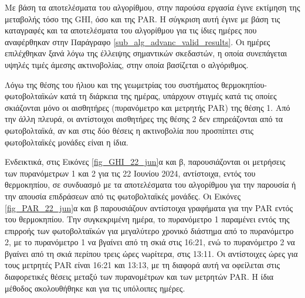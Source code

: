\documentclass[12pt, a4paper]{report} %
\newcommand{\english}{\foreignlanguage{english}}
\begin{document}
Με βάση τα αποτελέσματα του αλγορίθμου, στην παρούσα εργασία έγινε εκτίμηση της μεταβολής τόσο της \english{GHI}, όσο και της 
\english{PAR}. Η σύγκριση αυτή έγινε με βάση τις καταγραφές και τα αποτελέσματα του αλγορίθμου για τις ίδιες ημέρες που 
αναφέρθηκαν στην Παράγραφο \ref{sub_alg_advanc_valid_results}. Οι ημέρες επιλέχθηκαν ξανά λόγω της έλλειψης σημαντικών 
σκεδαστών, η οποία συνεπάγεται υψηλές τιμές άμεσης ακτινοβολίας, στην οποία βασίζεται ο αλγόριθμος.

Λόγω της θέσης του ήλιου και της γεωμετρίας του συστήματος θερμοκηπίου-φωτοβολταϊκών κατά τη διάρκεια της ημέρας, υπάρχουν 
στιγμές κατά τις οποίες σκιάζονται μόνο οι αισθητήρες (πυρανόμετρο και μετρητής \english{PAR}) της θέσης 1. Από την άλλη πλευρά, 
οι αντίστοιχοι αισθητήρες της θέσης 2 δεν επηρεάζονται από τα φωτοβολταϊκά, αν και στις δύο θέσεις η ακτινοβολία που προσπίπτει 
στις φωτοβολταϊκές μονάδες είναι η ίδια. 

Ενδεικτικά, στις Εικόνες \ref{fig_GHI_22_jun}α και β, παρουσιάζονται οι μετρήσεις των πυρανόμετρων 1 και 2 για τις 22 Ιουνίου 
2024, αντίστοιχα, εντός του θερμοκηπίου, σε συνδυασμό με τα αποτελέσματα του αλγορίθμου για την παρουσία ή την απουσία 
επιδράσεων από τις φωτοβολταϊκές μονάδες. Οι Εικόνες \ref{fig_PAR_22_jun}α και β παρουσιάζουν αντίστοιχα γραφήματα για την 
\english{PAR} εντός του θερμοκηπίου. Την συγκεκριμένη ημέρα, το πυρανόμετρο 1 παραμένει εντός της επιρροής των φωτοβολταϊκών 
για μεγαλύτερο χρονικό διάστημα από το πυρανόμετρο 2, με το πυρανόμετρο 1 να βγαίνει από τη σκιά στις 16:21, ενώ το πυρανόμετρο 
2 να βγαίνει από τη σκιά περίπου τρεις ώρες νωρίτερα, στις 13:11. Οι αντίστοιχες ώρες για τους μετρητές \english{PAR} είναι 
16:21 και 13:13, με τη διαφορά αυτή να οφείλεται στις διαφορετικές θέσεις μεταξύ των πυρανομέτρων και των μετρητών \english{PAR}. 
Η ίδια μέθοδος ακολουθήθηκε και για τις υπόλοιπες ημέρες.
\end{document}
